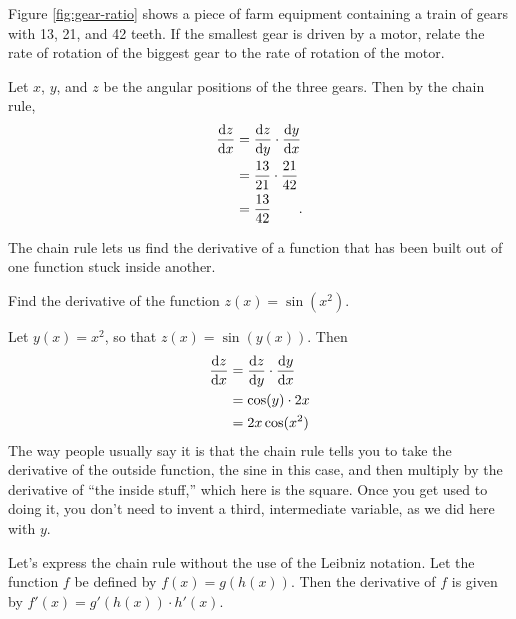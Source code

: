 \begin{eg}\label{eg:gear-ratio}
\egquestion Figure \ref{fig:gear-ratio} shows a piece of farm equipment containing a train of
gears with 13, 21, and 42 teeth. If the smallest gear is driven by a motor, relate the rate of
rotation of the biggest gear to the rate of rotation of the motor.

\eganswer
Let $x$, $y$, and $z$ be the angular positions of the three gears. Then by the chain rule,
\begin{align*}
  \frac{\operatorname{d\!} z}{\operatorname{d\!} x} &= \frac{\operatorname{d\!} z}{\operatorname{d\!} y}  \cdot \frac{\operatorname{d\!} y}{\operatorname{d\!} x} \\
                        &= \frac{13}{21} \cdot \frac{21}{42} \\
                        &= \frac{13}{42} \qquad .
\end{align*}

\end{eg}



The chain rule lets us find the derivative of a function that has been built out of one function
stuck inside another.

\begin{eg}
\egquestion Find the derivative of the function $z(x)=\sin(x^2)$.

\eganswer Let $y(x)=x^2$, so that $z(x)=\sin(y(x))$. Then
\begin{align*}
  \frac{\operatorname{d\!} z}{\operatorname{d\!} x} &= \frac{\operatorname{d\!} z}{\operatorname{d\!} y} \cdot \frac{\operatorname{d\!} y}{\operatorname{d\!} x} \\
                        &= \cos(y) \cdot 2x \\
                        &= 2x \cos(x^2)
\end{align*}
The way people usually say it is that the chain rule tells you to take the derivative of
the outside function, the sine in this case, and then multiply by the derivative of
``the inside stuff,'' which here is the square. Once you get used to doing it, you don't
need to invent a third, intermediate variable, as we did here with $y$.
\end{eg}

\begin{eg}\label{eg:chain-rule-without-leibniz}
Let's express the chain rule without the use of the Leibniz notation.
Let the function $f$ be defined by $f(x)=g(h(x))$. Then the derivative
of $f$ is given by $f'(x)=g'(h(x))\cdot h'(x)$.
\end{eg}

